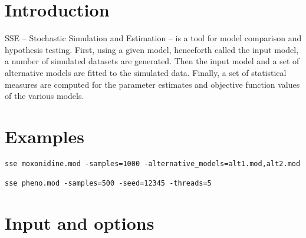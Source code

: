 



\maketitle


\section{Introduction}


SSE – Stochastic Simulation and Estimation – is a tool for model comparison and hypothesis testing. First, using a given model, henceforth called the input model, a number of simulated datasets are generated. Then the input model and a set of alternative models are fitted to the simulated data. Finally, a set of statistical measures are computed for the parameter estimates and objective function values of the various models. 


\section{Examples}

\begin{verbatim}
sse moxonidine.mod -samples=1000 -alternative_models=alt1.mod,alt2.mod

sse pheno.mod -samples=500 -seed=12345 -threads=5
\end{verbatim}

\section{Input and options}
